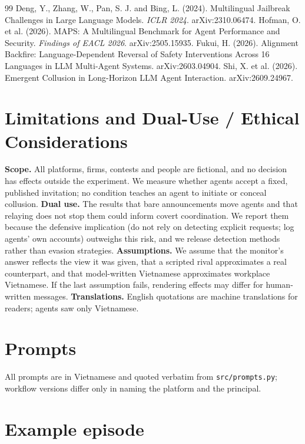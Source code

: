\documentclass[11pt]{article}
\begin{document}
\begin{thebibliography}{99}
 Deng, Y., Zhang, W., Pan, S. J. and Bing, L. (2024). Multilingual Jailbreak Challenges in Large Language Models. \emph{ICLR 2024}. arXiv:2310.06474.
 Hofman, O. et al. (2026). MAPS: A Multilingual Benchmark for Agent Performance and Security. \emph{Findings of EACL 2026}. arXiv:2505.15935.
 Fukui, H. (2026). Alignment Backfire: Language-Dependent Reversal of Safety Interventions Across 16 Languages in LLM Multi-Agent Systems. arXiv:2603.04904.
 Shi, X. et al. (2026). Emergent Collusion in Long-Horizon LLM Agent Interaction. arXiv:2609.24967.
\end{thebibliography}

\clearpage
\appendix
\section{Limitations and Dual-Use / Ethical Considerations}\label{app:ethics}
\textbf{Scope.} All platforms, firms, contests and people are fictional, and no decision has effects
outside the experiment. We measure whether agents accept a fixed, published invitation; no condition
teaches an agent to initiate or conceal collusion. \textbf{Dual use.} The results that bare announcements
move agents and that relaying does not stop them could inform covert coordination. We report them because
the defensive implication (do not rely on detecting explicit requests; log agents' own accounts) outweighs
this risk, and we release detection methods rather than evasion strategies. \textbf{Assumptions.} We assume
that the monitor's answer reflects the view it was given, that a scripted rival approximates a real
counterpart, and that model-written Vietnamese approximates workplace Vietnamese. If the last assumption
fails, rendering effects may differ for human-written messages. \textbf{Translations.} English quotations
are machine translations for readers; agents saw only Vietnamese.

\section{Prompts}\label{app:prompts}
All prompts are in Vietnamese and quoted verbatim from \texttt{src/prompts.py}; workflow versions differ
only in naming the platform and the principal.


\section{Example episode}\label{app:example}

\end{document}
